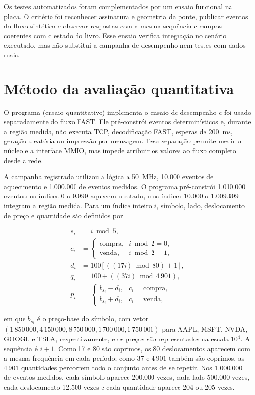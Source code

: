 Os testes automatizados foram complementados por um ensaio funcional na placa. O critério foi reconhecer assinatura e geometria da ponte, publicar eventos do fluxo sintético e observar respostas com a mesma sequência e campos coerentes com o estado do livro. Esse ensaio verifica integração no cenário executado, mas não substitui a campanha de desempenho nem testes com dados reais.

\section{Método da avaliação quantitativa}\label{subsec:metodoMedicoes}

O programa  (ensaio quantitativo) implementa o ensaio de desempenho e foi usado separadamente do fluxo FAST. Ele pré-constrói eventos determinísticos e, durante a região medida, não executa TCP, decodificação FAST, esperas de 200~ms, geração aleatória ou impressão por mensagem. Essa separação permite medir o núcleo e a interface MMIO, mas impede atribuir os valores ao fluxo completo desde a rede.

A campanha registrada utilizou a lógica a 50~MHz, 10.000 eventos de aquecimento e 1.000.000 de eventos medidos. O programa pré-constrói 1.010.000 eventos: os índices $0$ a $9.999$ aquecem o estado, e os índices $10.000$ a $1.009.999$ integram a região medida. Para um índice inteiro $i$, símbolo, lado, deslocamento de preço e quantidade são definidos por

\begin{align}
  s_i &= i \bmod 5, \\
  c_i &=
    \begin{cases}
      \text{compra}, & i \bmod 2 = 0, \\
      \text{venda},  & i \bmod 2 = 1,
    \end{cases} \\
  d_i &= 100\left[((17i) \bmod 80) + 1\right], \\
  q_i &= 100 + ((37i) \bmod 4\,901), \\
  p_i &=
    \begin{cases}
      b_{s_i} - d_i, & c_i = \text{compra}, \\
      b_{s_i} + d_i, & c_i = \text{venda},
    \end{cases}
\end{align}

em que $b_{s_i}$ é o preço-base do símbolo, com vetor $(1\,850\,000, 4\,150\,000, 8\,750\,000, 1\,700\,000, 1\,750\,000)$ para AAPL, MSFT, NVDA, GOOGL e TSLA, respectivamente, e os preços são representados na escala $10^4$. A sequência é $i+1$. Como 17 e 80 são coprimos, os 80 deslocamentos aparecem com a mesma frequência em cada período; como 37 e $4\,901$ também são coprimos, as $4\,901$ quantidades percorrem todo o conjunto antes de se repetir. Nos 1.000.000 de eventos medidos, cada símbolo aparece 200.000 vezes, cada lado 500.000 vezes, cada deslocamento 12.500 vezes e cada quantidade aparece 204 ou 205 vezes.

